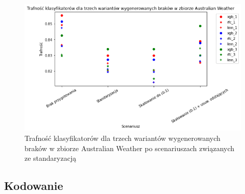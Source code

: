 \documentclass{book}
\begin{document}
    \begin{figure}[H]
    \centerline{\includegraphics[scale=0.8]{Aus_Weather_Standaryzacja}}
    \centering
    \caption{Trafność klasyfikatorów dla trzech wariantów wygenerowanych braków w zbiorze Australian Weather po scenariuszach związanych ze standaryzacją}
    \end{figure}

\subsection{Kodowanie}
\end{document}

